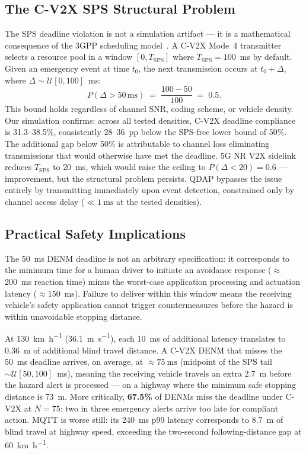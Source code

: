 \documentclass[journal]{IEEEtran}
\begin{document}
\subsection{The C-V2X SPS Structural Problem}

The SPS deadline violation is not a simulation artifact — it is a mathematical
consequence of the 3GPP scheduling model~\cite{3GPP_TS_36213}.
A C-V2X Mode~4 transmitter selects a resource pool in a window
$[0, T_{\text{SPS}}]$ where $T_{\text{SPS}} = 100$~ms by default.
Given an emergency event at time $t_0$, the next transmission occurs at
$t_0 + \Delta$, where $\Delta \sim \mathcal{U}[0, 100]$~ms:
\begin{equation}
  P(\Delta > 50\,\text{ms}) \;=\; \frac{100 - 50}{100} \;=\; 0.5.
  \label{eq:sps_miss}
\end{equation}
This bound holds regardless of channel SNR, coding scheme, or vehicle density.
Our simulation confirms: across all tested densities, C-V2X deadline compliance
is 31.3--38.5\%, consistently 28--36~pp below the SPS-free lower bound of 50\%.
The additional gap below 50\% is attributable to channel loss eliminating
transmissions that would otherwise have met the deadline.
5G NR V2X sidelink~\cite{Naik2019} reduces $T_{\text{SPS}}$ to 20~ms,
which would raise the ceiling to $P(\Delta < 20) = 0.6$ — improvement,
but the structural problem persists.
QDAP bypasses the issue entirely by transmitting immediately upon event
detection, constrained only by channel access delay ($\ll \SI{1}{\milli\second}$
at the tested densities).

\subsection{Practical Safety Implications}

The 50~ms DENM deadline is not an arbitrary specification: it corresponds to
the minimum time for a human driver to initiate an avoidance response
($\approx$\SI{200}{\milli\second} reaction time) minus the worst-case
application processing and actuation latency
($\approx$\SI{150}{\milli\second}).
Failure to deliver within this window means the receiving vehicle's
safety application cannot trigger countermeasures before the hazard is
within unavoidable stopping distance.

At \SI{130}{\kilo\metre\per\hour} (\SI{36.1}{\metre\per\second}), each
\SI{10}{\milli\second} of additional latency translates to \SI{0.36}{\metre}
of additional blind travel distance.
A C-V2X DENM that misses the \SI{50}{\milli\second} deadline arrives, on
average, at $\approx\SI{75}{\milli\second}$ (midpoint of the SPS tail
$\sim\mathcal{U}[50, 100]$~ms), meaning the receiving vehicle travels an
extra \SI{2.7}{\metre} before the hazard alert is processed — on a highway
where the minimum safe stopping distance is \SI{73}{\metre}.
More critically, \textbf{67.5\%} of DENMs miss the deadline under C-V2X at
$N{=}75$: two in three emergency alerts arrive too late for compliant action.
MQTT is worse still: its 240~ms p99 latency corresponds to \SI{8.7}{\metre}
of blind travel at highway speed, exceeding the two-second following-distance
gap at \SI{60}{\kilo\metre\per\hour}.
\end{document}
